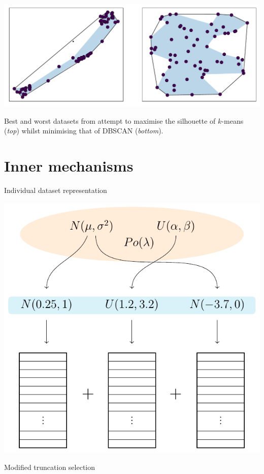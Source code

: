 \documentclass{betterposter}
\begin{document}
{\begin{center}
\begin{minipage}{.8\linewidth}
        \includegraphics[width=\linewidth]{img/dbscan.pdf}
    \end{minipage}
\end{center}

\textcolor{mygrey}{%
    Best and worst datasets from attempt to maximise the silhouette of
    \(k\)-means (\textit{top}) whilst minimising that of DBSCAN
    (\textit{bottom}).
}

}{%


\vspace{-3em}\section{Inner mechanisms}
\fontsize{40}{50}\selectfont
Individual dataset representation

\vspace{.75ex}\begin{center}
    \includegraphics[width=.65\linewidth]{tex/individual.pdf}
\end{center}

Modified truncation selection

}
\end{document}
